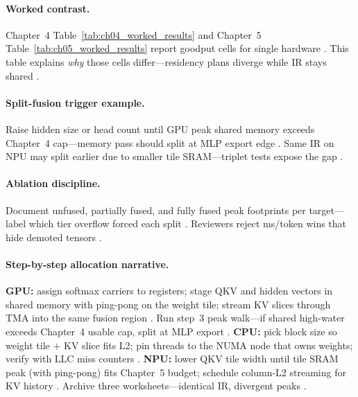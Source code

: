 \paragraph{Worked contrast.}
Chapter~4 Table~\ref{tab:ch04_worked_results} and Chapter~5 Table~\ref{tab:ch05_worked_results} report goodput cells for single hardware \citep{memoryfloor2026,taxbreak2026}.
This table explains \emph{why} those cells differ---residency plans diverge while IR stays shared \citep{yirage2026,patel2025llminference}.

\paragraph{Split-fusion trigger example.}
Raise hidden size or head count until GPU peak shared memory exceeds Chapter~4 cap---memory pass should split at MLP export edge \citep{yirage2026,nvidia2022hopper,memoryfloor2026}.
Same IR on NPU may split earlier due to smaller tile SRAM---triplet tests expose the gap \citep{amd2024aie,amd2024xdna,chen2020compilerbasedhardw}.

\paragraph{Ablation discipline.}
Document unfused, partially fused, and fully fused peak footprints per target---label which tier overflow forced each split \citep{wu2024mirage,yirage2026,taxbreak2026,memoryfloor2026}.
Reviewers reject ms/token wins that hide demoted tensors \citep{patel2025llminference}.

\paragraph{Step-by-step allocation narrative.}
\textbf{GPU:} assign softmax carriers to registers; stage QKV and hidden vectors in shared memory with ping-pong on the weight tile; stream KV slices through TMA into the same fusion region \citep{dao2022flashattention,semianalysis2024tma,nvidia2022hopper}.
Run step~3 peak walk---if shared high-water exceeds Chapter~4 usable cap, split at MLP export \citep{yirage2026,memoryfloor2026}.
\textbf{CPU:} pick block size so weight tile $+$ KV slice fits L2; pin threads to the NUMA node that owns weights; verify with LLC miss counters \citep{dlbook,patel2025llminference}.
\textbf{NPU:} lower QKV tile width until tile SRAM peak (with ping-pong) fits Chapter~5 budget; schedule column-L2 streaming for KV history \citep{amd2024xdna,amd2024aie}.
Archive three worksheets---identical IR, divergent peaks \citep{yirage2026,chen2020compilerbasedhardw}.

